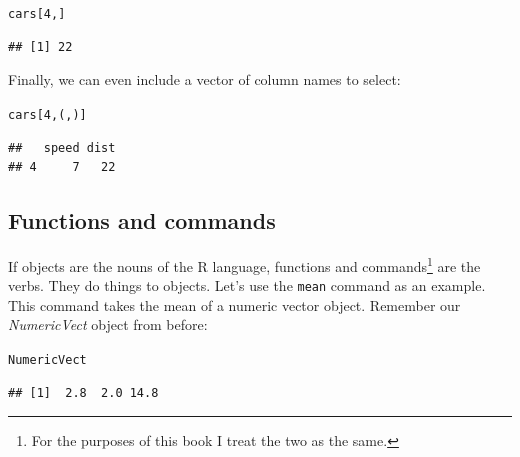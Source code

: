 \documentclass[krantz1]{krantz}
\begin{document}
\begin{knitrout}
\color{fgcolor}\begin{kframe}
\begin{alltt}
cars[4, ]
\end{alltt}
\begin{verbatim}
## [1] 22
\end{verbatim}
\end{kframe}
\end{knitrout}


\noindent Finally, we can even include a vector of column names to select:

\begin{knitrout}
\color{fgcolor}\begin{kframe}
\begin{alltt}
cars[4, (, )]
\end{alltt}
\begin{verbatim}
##   speed dist
## 4     7   22
\end{verbatim}
\end{kframe}
\end{knitrout}


\subsection{Functions and commands}\label{FunctionsCommands}

If objects are the nouns of the R language, functions and commands\footnote{For the purposes of this book I treat the two as the same.} are the verbs. They do things to objects. Let's use the \texttt{mean} command as an example. This command takes the mean of a numeric vector object. Remember our {\emph{NumericVect}} object from before:

\begin{knitrout}
\color{fgcolor}\begin{kframe}
\begin{alltt}
NumericVect
\end{alltt}
\begin{verbatim}
## [1]  2.8  2.0 14.8
\end{verbatim}
\end{kframe}
\end{knitrout}
\end{document}
